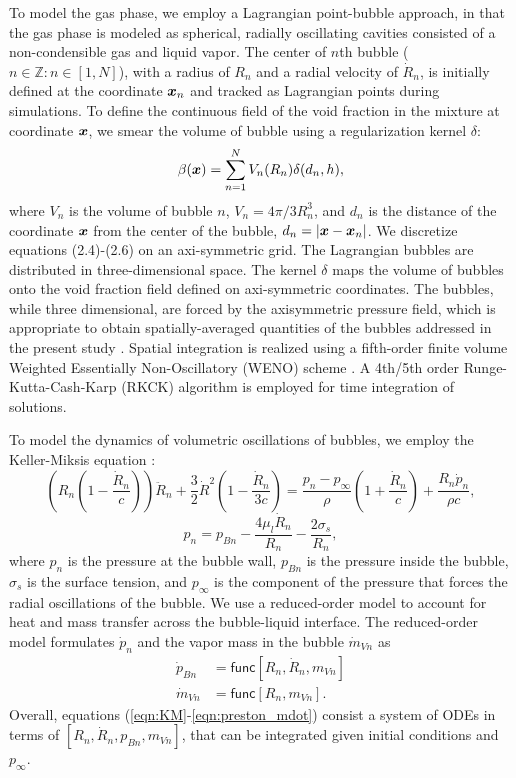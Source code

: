 \documentclass{jfm}
\def\vector#1{\mbox{\boldmath $#1$}}
\begin{document}
To model the gas phase, we employ a Lagrangian point-bubble approach, in that the gas phase is modeled as spherical, radially oscillating cavities consisted of a non-condensible gas and liquid vapor.
The center of $n$th bubble ($n\in\mathbb{Z}:n\in[1, N]$), with a radius of
$R_n$ and a radial velocity of $\dot{R}_n$, is initially defined at the coordinate
$\vector{x}_n$ and tracked as Lagrangian points during simulations.
To define the continuous field of the void fraction in the mixture at coordinate
$\vector{x}$, we smear the volume of bubble using a regularization kernel $\delta$:
\begin{equation}
\beta(\vector{x})=\sum^N_{n=1}V_n(R_n)\delta(d_n, h),
\label{eqn:beta}
\end{equation}
where $V_n$ is the volume of bubble $n$, $V_n=4\pi/3 R_n^3$, and $d_n$ is the distance of the coordinate $\vector{x}$ from the center of the bubble, $d_n=|\vector{x}-\vector{x}_n|$.
We discretize equations (2.4)-(2.6) on an axi-symmetric grid.
The Lagrangian bubbles are distributed in three-dimensional space.
The kernel $\delta$ maps the volume of bubbles onto the void fraction field defined on axi-symmetric coordinates.
The bubbles, while three dimensional, are forced by the axisymmetric pressure field, which is appropriate to obtain spatially-averaged quantities of the bubbles addressed in the present study \citep{Maeda17}.
Spatial integration is realized using a fifth-order finite volume Weighted Essentially Non-Oscillatory (WENO) scheme \citep{Coralic14}.
A 4th/5th order Runge-Kutta-Cash-Karp (RKCK) algorithm \citep{Cash90} is employed for time integration of solutions.

To model the dynamics of volumetric oscillations of bubbles, we employ the Keller-Miksis equation \citep{Keller80}:
\begin{equation}
\left(R_n\left(1-\frac{\dot{R}_n}{c}\right)\right)\ddot{R}_n
+
\frac{3}{2}\dot{R}^2\left(1-\frac{\dot{R}_n}{3c}\right)
=
\frac{p_n-p_\infty}{\rho}
\left(1+\frac{\dot{R}_n}{c}\right)+\frac{R_n\dot{p}_n}{\rho c},\label{eqn:KM}
\end{equation}
\begin{equation}
p_{n}=p_{Bn}-\frac{4\mu_l\dot{R}_n}{R_n}-\frac{2\sigma_s}{R_n},\label{eqn:pb}
\end{equation}
where $p_n$ is the pressure at the bubble wall,
$p_{Bn}$ is the pressure inside the bubble,
$\sigma_s$ is the surface tension,
and $p_\infty$ is the component of the pressure that forces the radial oscillations of the bubble. We use a reduced-order model \citep{Preston07} to account for heat and mass transfer across the bubble-liquid interface.
The reduced-order model formulates $\dot{p}_n$ and the vapor mass in the bubble $\dot{m}_{Vn}$ as
\begin{align}
\dot{p}_{Bn}
&=\textsf{func}
[R_n,\dot{R}_n,{m}_{Vn}]\label{eqn:preston_pdot}\\
\dot{m}_{Vn}
&=
\textsf{func}[R_n,{m}_{Vn}]\label{eqn:preston_mdot}.
\end{align}
Overall, equations (\ref{eqn:KM}-\ref{eqn:preston_mdot}) consist a system of
ODEs in terms of $[R_n,\dot{R}_n,p_{Bn},m_{Vn}]$, that can be integrated given initial conditions and $p_\infty$.
\end{document}
